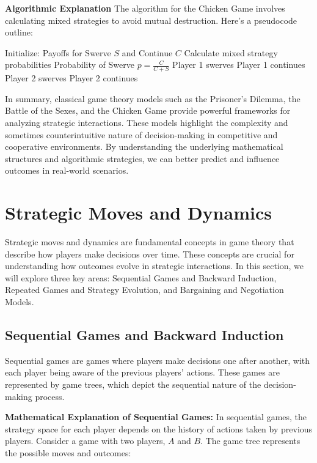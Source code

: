 \documentclass[12pt]{book} %
\begin{document}
\textbf{Algorithmic Explanation}
The algorithm for the Chicken Game involves calculating mixed strategies to avoid mutual destruction. Here's a pseudocode outline:
\FloatBarrier
\begin{algorithm}
\caption{Chicken Game Strategy}
\begin{algorithmic}[1]
\State Initialize: Payoffs for Swerve $S$ and Continue $C$
\State Calculate mixed strategy probabilities
\State Probability of Swerve $p = \frac{C}{C+S}$
    \State Player 1 swerves
\Else
    \State Player 1 continues
\EndIf
{}
    \State Player 2 swerves
\Else
    \State Player 2 continues
\EndIf
\end{algorithmic}
\end{algorithm}
\FloatBarrier

In summary, classical game theory models such as the Prisoner's Dilemma, the Battle of the Sexes, and the Chicken Game provide powerful frameworks for analyzing strategic interactions. These models highlight the complexity and sometimes counterintuitive nature of decision-making in competitive and cooperative environments. By understanding the underlying mathematical structures and algorithmic strategies, we can better predict and influence outcomes in real-world scenarios.


\section{Strategic Moves and Dynamics}
Strategic moves and dynamics are fundamental concepts in game theory that describe how players make decisions over time. These concepts are crucial for understanding how outcomes evolve in strategic interactions. In this section, we will explore three key areas: Sequential Games and Backward Induction, Repeated Games and Strategy Evolution, and Bargaining and Negotiation Models.

\subsection{Sequential Games and Backward Induction}
Sequential games are games where players make decisions one after another, with each player being aware of the previous players' actions. These games are represented by game trees, which depict the sequential nature of the decision-making process.

\textbf{Mathematical Explanation of Sequential Games:}
In sequential games, the strategy space for each player depends on the history of actions taken by previous players. Consider a game with two players, $A$ and $B$. The game tree represents the possible moves and outcomes:
\end{document}

